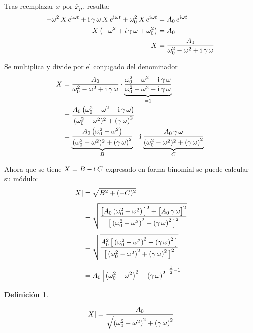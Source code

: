 \documentclass[a5paper,12pt,twoside]{book}
\newtheorem{defn}{{Definición}}[chapter]
\begin{document}
Tras reemplazar $x$ por $\check{x}_p$, resulta:
\begin{align*}
    - \omega^2 \, X \, e^{\mathrm{i}\mkern1mu \omega t} + \mathrm{i}\mkern1mu \, \gamma \, \omega \, X \, e^{\mathrm{i}\mkern1mu \omega t} + \omega_0^2 \, X \, e^{\mathrm{i}\mkern1mu \omega t} &= A_0 \, e^{\mathrm{i}\mkern1mu \omega t}
    \\
    X \left( - \omega^2 + i \, \gamma \, \omega + \omega_0^2 \right) &= A_0
    \\
    X &= \frac{A_0}{\omega_0^2 - \omega^2 + \mathrm{i}\mkern1mu \, \gamma \, \omega}
\end{align*}

Se multiplica y divide por el conjugado del denominador
\begin{align*}
    X &= \frac{A_0}{\omega_0^2 - \omega^2 + \mathrm{i}\mkern1mu \, \gamma \, \omega} \cdot \underbrace{\frac{\omega_0^2 - \omega^2 - \mathrm{i}\mkern1mu \, \gamma \, \omega}{\omega_0^2 - \omega^2 - \mathrm{i}\mkern1mu \, \gamma \, \omega}}_{=1}
    \\
    &= \frac{A_0 \left( \omega_0^2 - \omega^2 - \mathrm{i}\mkern1mu \, \gamma \, \omega \right)}{(\omega_0^2 - \omega^2)^2 + \left( \gamma \, \omega \right)^2}
    \\
    &= \underbrace{\frac{A_0 \left( \omega_0^2 - \omega^2 \right)}{(\omega_0^2 - \omega^2)^2 + \left( \gamma \, \omega \right)^2}}_B - \mathrm{i}\mkern1mu \underbrace{\frac{A_0 \, \gamma \, \omega}{(\omega_0^2 - \omega^2)^2 + \left( \gamma \, \omega \right)^2}}_C
\end{align*}

Ahora que se tiene $X = B - \mathrm{i}\mkern1mu \, C$ expresado en forma binomial se puede calcular su módulo:
\begin{align*}
    {\left| {X} \right|} &= \sqrt{B^2+(-C)^2}
    \\[1ex]
    &= \sqrt{\frac{\big[A_0 \left( \omega_0^2 - \omega^2 \right) \big]^2 + \big[ A_0 \, \gamma \, \omega \big]^2}{\big[ \left( \omega_0^2 - \omega^2 \right)^2 + \left( \gamma \, \omega \right)^2 \big]^2}}
    \\[1ex]
    &= \sqrt{\frac{A_0^2 \, \big[ \left( \omega_0^2 - \omega^2 \right)^2 + \left( \gamma \, \omega \right)^2 \big]}{\big[ \left(\omega_0^2 - \omega^2 \right)^2 + \left( \gamma \, \omega \right)^2 \big]^2}}
    \\[1ex]
    &= A_0 \left[ \left(\omega_0^2 - \omega^2 \right)^2 + \left( \gamma \, \omega \right)^2 \right]^{\tfrac{1}{2}-1}
\end{align*}

\begin{mdframed}[style=MyFrame1]
    \begin{defn}
    \end{defn}
    \begin{equation*}
        {\left| {X} \right|} = \frac{A_0}{\sqrt{ \left(\omega_0^2 - \omega^2 \right)^2 + \left( \gamma \, \omega \right)^2}}
    \end{equation*}
\end{mdframed}
\end{document}
